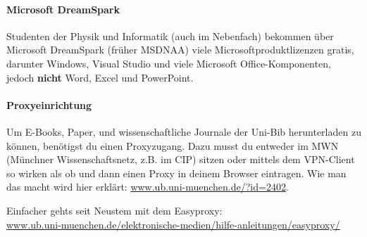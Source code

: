 \paragraph{Microsoft DreamSpark}
Studenten der Physik und Informatik (auch im Nebenfach) bekommen über
Microsoft DreamSpark (früher MSDNAA) viele Microsoftproduktlizenzen
gratis, darunter Windows, Visual Studio und viele
Microsoft Office-Komponenten, jedoch \textbf{nicht} Word, Excel und PowerPoint.

\paragraph{Proxyeinrichtung}

Um E-Books, Paper, und wissenschaftliche Journale der Uni-Bib
herunterladen zu können, benötigst du einen Proxyzugang. Dazu musst du
entweder im MWN (Münchner Wissenschaftsnetz, z.B. im CIP) sitzen oder
mittels dem VPN-Client so wirken als ob und dann einen Proxy in deinem
Browser eintragen. Wie man das macht wird hier erklärt:
\url{www.ub.uni-muenchen.de/?id=2402}.

Einfacher gehts seit Neustem mit dem Easyproxy:\\
\url{www.ub.uni-muenchen.de/elektronische-medien/hilfe-anleitungen/easyproxy/}
